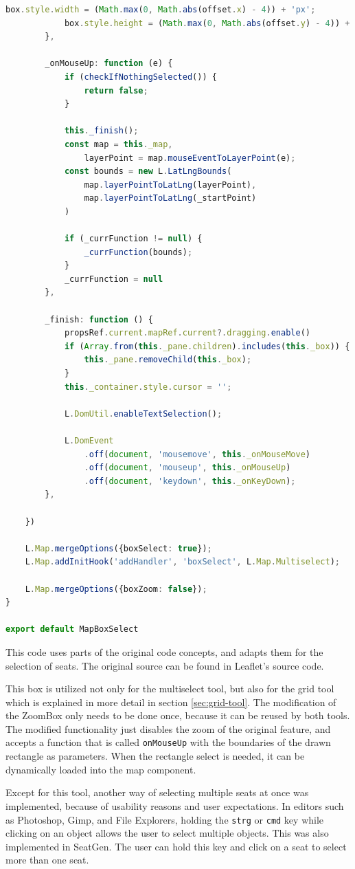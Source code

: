 \begin{lstlisting}[language=Typescript, caption={Multiselect Tool},label={lst:multiselect-tool}]
            box.style.width = (Math.max(0, Math.abs(offset.x) - 4)) + 'px';
            box.style.height = (Math.max(0, Math.abs(offset.y) - 4)) + 'px';
        },

        _onMouseUp: function (e) {
            if (checkIfNothingSelected()) {
                return false;
            }

            this._finish();
            const map = this._map,
                layerPoint = map.mouseEventToLayerPoint(e);
            const bounds = new L.LatLngBounds(
                map.layerPointToLatLng(layerPoint),
                map.layerPointToLatLng(_startPoint)
            )

            if (_currFunction != null) {
                _currFunction(bounds);
            }
            _currFunction = null
        },

        _finish: function () {
            propsRef.current.mapRef.current?.dragging.enable()
            if (Array.from(this._pane.children).includes(this._box)) {
                this._pane.removeChild(this._box);
            }
            this._container.style.cursor = '';

            L.DomUtil.enableTextSelection();

            L.DomEvent
                .off(document, 'mousemove', this._onMouseMove)
                .off(document, 'mouseup', this._onMouseUp)
                .off(document, 'keydown', this._onKeyDown);
        },

    })

    L.Map.mergeOptions({boxSelect: true});
    L.Map.addInitHook('addHandler', 'boxSelect', L.Map.Multiselect);

    L.Map.mergeOptions({boxZoom: false});
}

export default MapBoxSelect
\end{lstlisting}

This code uses parts of the original code concepts, and adapts them for the selection of seats. The original source can be found in Leaflet's source code.

This box is utilized not only for the multiselect tool, but also for the grid tool which is explained in more detail in section \ref{sec:grid-tool}. The modification of the ZoomBox only needs to be done once, because it can be reused by both tools. The modified functionality just disables the zoom of the original feature, and accepts a function that is called \texttt{onMouseUp} with the boundaries of the drawn rectangle as parameters. When the rectangle select is needed, it can be dynamically loaded into the map component.

Except for this tool, another way of selecting multiple seats at once was implemented, because of usability reasons and user expectations. In editors such as Photoshop, Gimp, and File Explorers, holding the \texttt{strg} or \texttt{cmd} key while clicking on an object allows the user to select multiple objects. This was also implemented in SeatGen. The user can hold this key and click on a seat to select more than one seat.